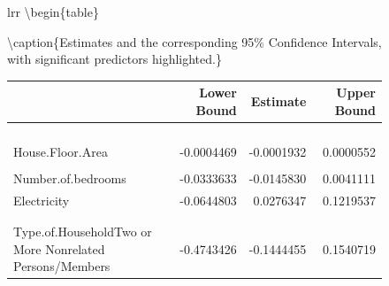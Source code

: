 \documentclass[
]{article}
\begin{document}
\begin{figure}[H]
\begin{table}[H]
\begin{tabular}[t]{lrr}
\textbackslash begin\{table\}

\textbackslash caption\{\label{tab:table of estimates and confidence intervals}Estimates
and the corresponding 95\% Confidence Intervals, with significant
predictors highlighted.\} \centering

\begin{tabular}[t]{l|r|r|r}
\hline
  & Lower Bound & Estimate & Upper Bound\\
\hline
\cellcolor[HTML]{A1E8F1}{\textcolor{black}{(Intercept)}} & \cellcolor[HTML]{A1E8F1}{\textcolor{black}{1.2687606}} & \cellcolor[HTML]{A1E8F1}{\textcolor{black}{1.4254422}} & \cellcolor[HTML]{A1E8F1}{\textcolor{black}{1.5810043}}\\
\hline
\cellcolor[HTML]{A1E8F1}{\textcolor{black}{Total.Household.Income}} & \cellcolor[HTML]{A1E8F1}{\textcolor{black}{-0.0035110}} & \cellcolor[HTML]{A1E8F1}{\textcolor{black}{-0.0022045}} & \cellcolor[HTML]{A1E8F1}{\textcolor{black}{-0.0009192}}\\
\hline
\cellcolor[HTML]{A1E8F1}{\textcolor{black}{Total.Food.Expenditure}} & \cellcolor[HTML]{A1E8F1}{\textcolor{black}{0.0430507}} & \cellcolor[HTML]{A1E8F1}{\textcolor{black}{0.0500316}} & \cellcolor[HTML]{A1E8F1}{\textcolor{black}{0.0569775}}\\
\hline
\cellcolor[HTML]{A1E8F1}{\textcolor{black}{Household.Head.Age}} & \cellcolor[HTML]{A1E8F1}{\textcolor{black}{-0.0042279}} & \cellcolor[HTML]{A1E8F1}{\textcolor{black}{-0.0025205}} & \cellcolor[HTML]{A1E8F1}{\textcolor{black}{-0.0008148}}\\
\hline
House.Floor.Area & -0.0004469 & -0.0001932 & 0.0000552\\
\hline
\cellcolor[HTML]{A1E8F1}{\textcolor{black}{House.Age}} & \cellcolor[HTML]{A1E8F1}{\textcolor{black}{-0.0038392}} & \cellcolor[HTML]{A1E8F1}{\textcolor{black}{-0.0023168}} & \cellcolor[HTML]{A1E8F1}{\textcolor{black}{-0.0008069}}\\
\hline
Number.of.bedrooms & -0.0333633 & -0.0145830 & 0.0041111\\
\hline
Electricity & -0.0644803 & 0.0276347 & 0.1219537\\
\hline
\cellcolor[HTML]{A1E8F1}{\textcolor{black}{Household.Head.SexMale}} & \cellcolor[HTML]{A1E8F1}{\textcolor{black}{0.1623556}} & \cellcolor[HTML]{A1E8F1}{\textcolor{black}{0.2202770}} & \cellcolor[HTML]{A1E8F1}{\textcolor{black}{0.2788479}}\\
\hline
\cellcolor[HTML]{A1E8F1}{\textcolor{black}{Type.of.HouseholdSingle Family}} & \cellcolor[HTML]{A1E8F1}{\textcolor{black}{-0.3967514}} & \cellcolor[HTML]{A1E8F1}{\textcolor{black}{-0.3481835}} & \cellcolor[HTML]{A1E8F1}{\textcolor{black}{-0.2995260}}\\
\hline
Type.of.HouseholdTwo or More Nonrelated Persons/Members & -0.4743426 & -0.1444455 & 0.1540719\\
\hline
\end{tabular}


\end{tabular}
\end{table}
\end{figure}
\end{document}
